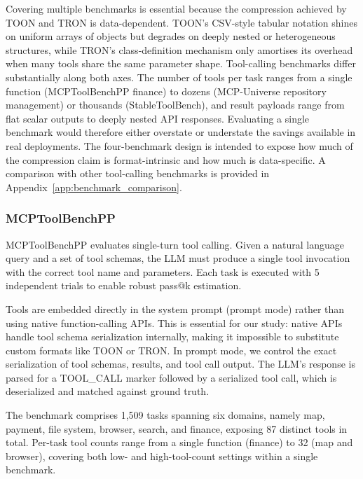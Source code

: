 \documentclass[11pt]{article}
\begin{document}
Covering multiple benchmarks is essential because the compression achieved by TOON and TRON is data-dependent. TOON's CSV-style tabular notation shines on uniform arrays of objects but degrades on deeply nested or heterogeneous structures, while TRON's class-definition mechanism only amortises its overhead when many tools share the same parameter shape. Tool-calling benchmarks differ substantially along both axes. The number of tools per task ranges from a single function (MCPToolBenchPP finance) to dozens (MCP-Universe repository management) or thousands (StableToolBench), and result payloads range from flat scalar outputs to deeply nested API responses. Evaluating a single benchmark would therefore either overstate or understate the savings available in real deployments. The four-benchmark design is intended to expose how much of the compression claim is format-intrinsic and how much is data-specific. A comparison with other tool-calling benchmarks is provided in Appendix~\ref{app:benchmark_comparison}.

\subsubsection{MCPToolBenchPP}
MCPToolBenchPP \citep{fan2025mcptoolbench} evaluates single-turn tool calling. Given a natural language query and a set of tool schemas, the LLM must produce a single tool invocation with the correct tool name and parameters. Each task is executed with 5 independent trials to enable robust pass@k estimation.

Tools are embedded directly in the system prompt (prompt mode) rather than using native function-calling APIs. This is essential for our study: native APIs handle tool schema serialization internally, making it impossible to substitute custom formats like TOON or TRON. In prompt mode, we control the exact serialization of tool schemas, results, and tool call output. The LLM's response is parsed for a TOOL\_CALL marker followed by a serialized tool call, which is deserialized and matched against ground truth.

The benchmark comprises 1,509 tasks spanning six domains, namely map, payment, file system, browser, search, and finance, exposing 87 distinct tools in total. Per-task tool counts range from a single function (finance) to 32 (map and browser), covering both low- and high-tool-count settings within a single benchmark.
\end{document}
